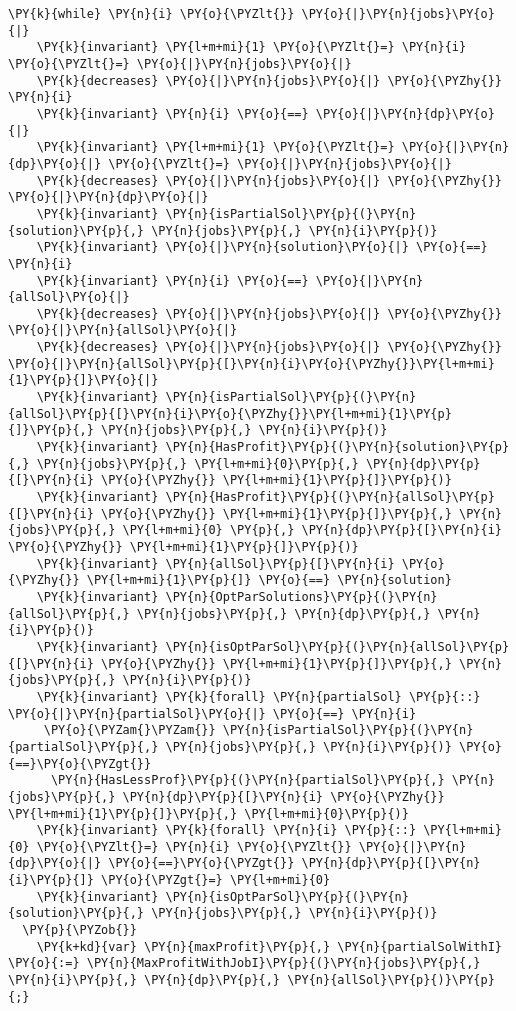 \begin{Verbatim}[commandchars=\\\{\}, fontsize=\small]
  \PY{k}{while} \PY{n}{i} \PY{o}{\PYZlt{}} \PY{o}{|}\PY{n}{jobs}\PY{o}{|}
    \PY{k}{invariant} \PY{l+m+mi}{1} \PY{o}{\PYZlt{}=} \PY{n}{i} \PY{o}{\PYZlt{}=} \PY{o}{|}\PY{n}{jobs}\PY{o}{|}
    \PY{k}{decreases} \PY{o}{|}\PY{n}{jobs}\PY{o}{|} \PY{o}{\PYZhy{}} \PY{n}{i}
    \PY{k}{invariant} \PY{n}{i} \PY{o}{==} \PY{o}{|}\PY{n}{dp}\PY{o}{|}
    \PY{k}{invariant} \PY{l+m+mi}{1} \PY{o}{\PYZlt{}=} \PY{o}{|}\PY{n}{dp}\PY{o}{|} \PY{o}{\PYZlt{}=} \PY{o}{|}\PY{n}{jobs}\PY{o}{|}
    \PY{k}{decreases} \PY{o}{|}\PY{n}{jobs}\PY{o}{|} \PY{o}{\PYZhy{}} \PY{o}{|}\PY{n}{dp}\PY{o}{|}
    \PY{k}{invariant} \PY{n}{isPartialSol}\PY{p}{(}\PY{n}{solution}\PY{p}{,} \PY{n}{jobs}\PY{p}{,} \PY{n}{i}\PY{p}{)}
    \PY{k}{invariant} \PY{o}{|}\PY{n}{solution}\PY{o}{|} \PY{o}{==} \PY{n}{i}
    \PY{k}{invariant} \PY{n}{i} \PY{o}{==} \PY{o}{|}\PY{n}{allSol}\PY{o}{|}
    \PY{k}{decreases} \PY{o}{|}\PY{n}{jobs}\PY{o}{|} \PY{o}{\PYZhy{}} \PY{o}{|}\PY{n}{allSol}\PY{o}{|}
    \PY{k}{decreases} \PY{o}{|}\PY{n}{jobs}\PY{o}{|} \PY{o}{\PYZhy{}} \PY{o}{|}\PY{n}{allSol}\PY{p}{[}\PY{n}{i}\PY{o}{\PYZhy{}}\PY{l+m+mi}{1}\PY{p}{]}\PY{o}{|}
    \PY{k}{invariant} \PY{n}{isPartialSol}\PY{p}{(}\PY{n}{allSol}\PY{p}{[}\PY{n}{i}\PY{o}{\PYZhy{}}\PY{l+m+mi}{1}\PY{p}{]}\PY{p}{,} \PY{n}{jobs}\PY{p}{,} \PY{n}{i}\PY{p}{)}
    \PY{k}{invariant} \PY{n}{HasProfit}\PY{p}{(}\PY{n}{solution}\PY{p}{,} \PY{n}{jobs}\PY{p}{,} \PY{l+m+mi}{0}\PY{p}{,} \PY{n}{dp}\PY{p}{[}\PY{n}{i} \PY{o}{\PYZhy{}} \PY{l+m+mi}{1}\PY{p}{]}\PY{p}{)}
    \PY{k}{invariant} \PY{n}{HasProfit}\PY{p}{(}\PY{n}{allSol}\PY{p}{[}\PY{n}{i} \PY{o}{\PYZhy{}} \PY{l+m+mi}{1}\PY{p}{]}\PY{p}{,} \PY{n}{jobs}\PY{p}{,} \PY{l+m+mi}{0} \PY{p}{,} \PY{n}{dp}\PY{p}{[}\PY{n}{i} \PY{o}{\PYZhy{}} \PY{l+m+mi}{1}\PY{p}{]}\PY{p}{)}
    \PY{k}{invariant} \PY{n}{allSol}\PY{p}{[}\PY{n}{i} \PY{o}{\PYZhy{}} \PY{l+m+mi}{1}\PY{p}{]} \PY{o}{==} \PY{n}{solution}
    \PY{k}{invariant} \PY{n}{OptParSolutions}\PY{p}{(}\PY{n}{allSol}\PY{p}{,} \PY{n}{jobs}\PY{p}{,} \PY{n}{dp}\PY{p}{,} \PY{n}{i}\PY{p}{)}
    \PY{k}{invariant} \PY{n}{isOptParSol}\PY{p}{(}\PY{n}{allSol}\PY{p}{[}\PY{n}{i} \PY{o}{\PYZhy{}} \PY{l+m+mi}{1}\PY{p}{]}\PY{p}{,} \PY{n}{jobs}\PY{p}{,} \PY{n}{i}\PY{p}{)}
    \PY{k}{invariant} \PY{k}{forall} \PY{n}{partialSol} \PY{p}{::} \PY{o}{|}\PY{n}{partialSol}\PY{o}{|} \PY{o}{==} \PY{n}{i} 
     \PY{o}{\PYZam{}\PYZam{}} \PY{n}{isPartialSol}\PY{p}{(}\PY{n}{partialSol}\PY{p}{,} \PY{n}{jobs}\PY{p}{,} \PY{n}{i}\PY{p}{)} \PY{o}{==}\PY{o}{\PYZgt{}}
      \PY{n}{HasLessProf}\PY{p}{(}\PY{n}{partialSol}\PY{p}{,} \PY{n}{jobs}\PY{p}{,} \PY{n}{dp}\PY{p}{[}\PY{n}{i} \PY{o}{\PYZhy{}} \PY{l+m+mi}{1}\PY{p}{]}\PY{p}{,} \PY{l+m+mi}{0}\PY{p}{)}
    \PY{k}{invariant} \PY{k}{forall} \PY{n}{i} \PY{p}{::} \PY{l+m+mi}{0} \PY{o}{\PYZlt{}=} \PY{n}{i} \PY{o}{\PYZlt{}} \PY{o}{|}\PY{n}{dp}\PY{o}{|} \PY{o}{==}\PY{o}{\PYZgt{}} \PY{n}{dp}\PY{p}{[}\PY{n}{i}\PY{p}{]} \PY{o}{\PYZgt{}=} \PY{l+m+mi}{0}
    \PY{k}{invariant} \PY{n}{isOptParSol}\PY{p}{(}\PY{n}{solution}\PY{p}{,} \PY{n}{jobs}\PY{p}{,} \PY{n}{i}\PY{p}{)}
  \PY{p}{\PYZob{}}
    \PY{k+kd}{var} \PY{n}{maxProfit}\PY{p}{,} \PY{n}{partialSolWithI} \PY{o}{:=} \PY{n}{MaxProfitWithJobI}\PY{p}{(}\PY{n}{jobs}\PY{p}{,} \PY{n}{i}\PY{p}{,} \PY{n}{dp}\PY{p}{,} \PY{n}{allSol}\PY{p}{)}\PY{p}{;}


\end{Verbatim}
